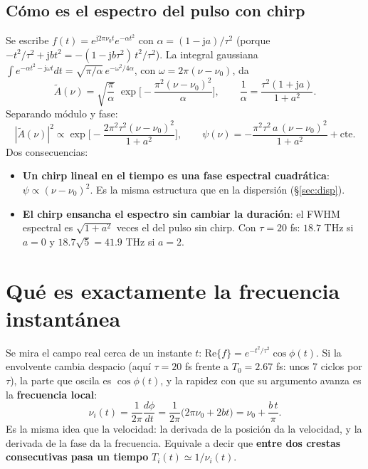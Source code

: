 \documentclass[11pt]{article}
\newcommand{\jj}{\mathrm{j}}
\begin{document}
\subsection{Cómo es el espectro del pulso con chirp}
Se escribe $f(t)=e^{\jj2\pi\nu_0t}e^{-\alpha t^2}$ con $\alpha=(1-\jj a)/\tau^2$ (porque $-t^2/\tau^2+\jj bt^2=-(1-\jj b\tau^2)\,t^2/\tau^2$). La integral gaussiana $\int e^{-\alpha t^2-\jj\omega t}dt=\sqrt{\pi/\alpha}\,e^{-\omega^2/4\alpha}$, con $\omega=2\pi(\nu-\nu_0)$, da
\[
\tilde A(\nu)=\sqrt{\frac{\pi}{\alpha}}\;\exp\!\Big[-\frac{\pi^2(\nu-\nu_0)^2}{\alpha}\Big],\qquad \frac1\alpha=\frac{\tau^2(1+\jj a)}{1+a^2}.
\]
Separando módulo y fase:
\begin{equation}\label{eq:espectro}
|\tilde A(\nu)|^2\propto\exp\!\Big[-\frac{2\pi^2\tau^2(\nu-\nu_0)^2}{1+a^2}\Big],\qquad
\psi(\nu)=-\frac{\pi^2\tau^2\,a\,(\nu-\nu_0)^2}{1+a^2}+\text{cte}.
\end{equation}
Dos consecuencias:
\begin{itemize}
\item \textbf{Un chirp lineal en el tiempo es una fase espectral cuadrática}: $\psi\propto(\nu-\nu_0)^2$. Es la misma estructura que en la dispersión (§\ref{sec:disp}).
\item \textbf{El chirp ensancha el espectro sin cambiar la duración}: el FWHM espectral es $\sqrt{1+a^2}$ veces el del pulso sin chirp. Con $\tau=20$ fs: $18.7$ THz si $a=0$ y $18.7\sqrt5=41.9$ THz si $a=2$.
\end{itemize}

\section{Qué es exactamente la frecuencia instantánea}
Se mira el campo real cerca de un instante $t$: $\mathrm{Re}\{f\}=e^{-t^2/\tau^2}\cos\phi(t)$. Si la envolvente cambia despacio (aquí $\tau=20$ fs frente a $T_0=2.67$ fs: unos 7 ciclos por $\tau$), la parte que oscila es $\cos\phi(t)$, y la rapidez con que su argumento avanza es la \textbf{frecuencia local}:
\[
\nu_i(t)=\frac1{2\pi}\frac{d\phi}{dt}=\frac1{2\pi}\big(2\pi\nu_0+2bt\big)=\nu_0+\frac{b\,t}{\pi}.
\]
Es la misma idea que la velocidad: la derivada de la posición da la velocidad, y la derivada de la fase da la frecuencia. Equivale a decir que \textbf{entre dos crestas consecutivas pasa un tiempo} $T_i(t)\simeq1/\nu_i(t)$.
\end{document}
